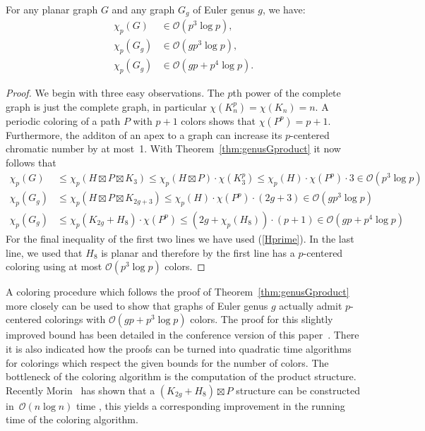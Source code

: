 \begin{corollary}\label{cor:p+g}
For any planar graph $G$ and any graph $G_g$ of Euler genus $g$, we have:
\begin{align*}
\chi_p(G)&\in \mathcal{O}(p^3 \log p),\\
\chi_p(G_g)&\in \mathcal{O}(g p^3\log p),\\
\chi_p(G_g)&\in \mathcal{O}(gp + p^4\log p).
\end{align*}
\end{corollary}
\begin{proof}
  We begin with three easy observations.
  The $p$th power of the complete graph is just the complete graph, in
  particular $\chi(K_n^p)=\chi(K_n)=n$. A periodic coloring of a path $P$ with
  $p+1$ colors shows that $\chi(P^p)=p+1$. Furthermore, the additon of an apex
  to a graph can increase its $p$-centered chromatic number by at most~1. With
  Theorem~\ref{thm:genusGproduct} it now follows that
\begin{align*}
\chi_p(G)&\leq \chi_p(H\boxtimes P \boxtimes K_3)\leq \chi_p(H\boxtimes P) \cdot \chi(K_3^p)\leq \chi_p(H) \cdot \chi(P^p)\cdot 3 \in \mathcal{O}(p^3 \log p)\\
\chi_p(G_g)&\leq \chi_p(H\boxtimes P \boxtimes K_{2g+3})\leq \chi_p(H) \cdot \chi(P^p)\cdot (2g+3) \in \mathcal{O}(g p^3\log p)\\
\chi_p(G_g)&\leq \chi_p(K_{2g}+H_8) \cdot \chi(P^p)\leq (2g+\chi_p(H_8))\cdot (p+1)\in \mathcal{O}(gp + p^4\log p)
\end{align*}
For the final inequality of the first two lines we have used (\ref{Hprime}).
In the last line, we used that $H_8$ is planar and therefore by the first
line has a $p$-centered coloring using at most $\mathcal{O}(p^3\log p)$ colors.
\end{proof}

A coloring procedure which follows the proof of
Theorem~\ref{thm:genusGproduct} more closely can be used to show that graphs
of Euler genus $g$ actually admit $p$-centered colorings with
$\mathcal{O}(gp+p^3\log p)$ colors.  The proof for this slightly improved bound has
been detailed in the conference version of this paper~\cite{DFMS20}.  There it
is also indicated how the proofs can be turned into quadratic time algorithms
for colorings which respect the given bounds for the number of colors. The
bottleneck of the coloring algorithm is the computation of the product
structure.  Recently Morin~\cite{Morin21} has shown that a
$(K_{2g}+H_8)\boxtimes P$ structure can be constructed in~$\mathcal{O}(n\log n)$
time , this yields a corresponding improvement in the running time of the coloring
algorithm.



